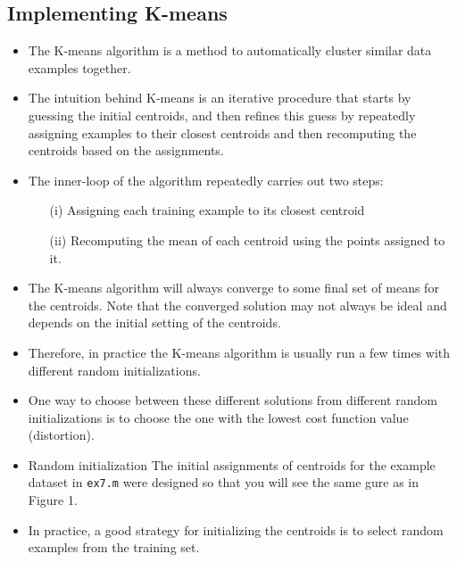 \documentclass[12pt]{article}
\begin{document}
\subsection{Implementing K-means}
\begin{itemize}
\item The K-means algorithm is a method to automatically cluster similar data examples together.

\item The intuition behind K-means is an iterative procedure that starts by guessing the initial centroids, and then refines this guess by repeatedly assigning examples to their closest centroids and then recomputing the centroids based on the assignments.

\item The inner-loop of the algorithm repeatedly carries out two steps: 
\begin{itemize}
\item[(i)] Assigning each training example to its closest centroid 
\item[(ii)] Recomputing the mean of each centroid using the points assigned to it. 
\end{itemize}


\item The K-means algorithm will always converge to some final set of means for the centroids.
Note that the converged solution may not always be ideal and depends on the initial setting of the centroids. 

\item Therefore, in practice the K-means algorithm is usually run a few times with different random initializations. 

\item One way to choose between these different solutions from different random initializations is to choose the one with the lowest cost function value (distortion).

\item Random initialization
The initial assignments of centroids for the example dataset in \texttt{ex7.m} were designed so that you will see the same gure as in Figure 1. 

\item In practice, a good strategy for initializing the centroids is to select random examples from the training set.
\end{itemize}
\end{document}
